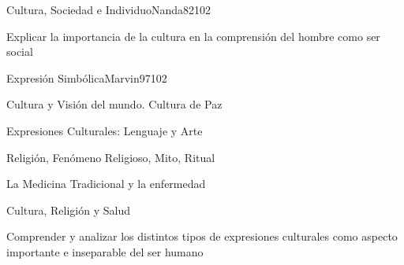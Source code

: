 \begin{syllabus}
\begin{unit}{Cultura, Sociedad e Individuo}{Nanda82}{10}{2}
   \begin{learningoutcomes}
      \item Explicar la importancia de la cultura en la comprensión del hombre como ser social
   \end{learningoutcomes}
\end{unit}

\begin{unit}{Expresión Simbólica}{Marvin97}{10}{2}
   \begin{topics}
      \item Cultura y Visión del mundo. Cultura de Paz
	\item Expresiones Culturales: Lenguaje y Arte
	\item Religión, Fenómeno Religioso, Mito, Ritual
	\item La Medicina Tradicional y la enfermedad
	\item Cultura, Religión y Salud
   \end{topics}

   \begin{learningoutcomes}
      \item Comprender y analizar los distintos tipos de expresiones culturales como aspecto importante e inseparable del ser humano
   \end{learningoutcomes}
\end{unit}

\begin{coursebibliography}
\end{coursebibliography}
\end{syllabus}
